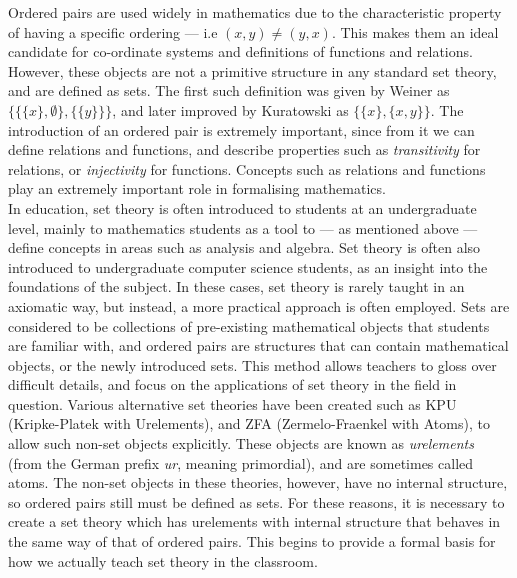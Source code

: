 \documentclass[11pt]{report}
\theoremstyle{definition}
\theoremstyle{theorem}
\theoremstyle{lemma}
\begin{document}
Ordered pairs are used widely in mathematics due to the characteristic property of having a specific ordering --- i.e $(x,y) \neq (y,x)$.
This makes them an ideal candidate for co-ordinate systems and definitions of functions and relations.
However, these objects are not a primitive structure in any standard set theory, and are defined as sets.
The first such definition was given by Weiner as $\{\{\{x\},\emptyset\},\{\{y\}\}\}$, and later improved by Kuratowski as $\{\{x\},\{x,y\}\}$.
The introduction of an ordered pair is extremely important, since from it we can define relations and functions, and describe properties such as \emph{transitivity} for relations, or \emph{injectivity} for functions.
Concepts such as relations and functions play an extremely important role in formalising mathematics.\\

In education, set theory is often introduced to students at an undergraduate level, mainly to mathematics students as a tool to --- as mentioned above --- define concepts in areas such as analysis and algebra.
Set theory is often also introduced to undergraduate computer science students, as an insight into the foundations of the subject.
In these cases, set theory is rarely taught in an axiomatic way, but instead, a more practical approach is often employed. 
Sets are considered to be collections of pre-existing mathematical objects that students are familiar with, and ordered pairs are structures that can contain mathematical objects, or the newly introduced sets.  
This method allows teachers to gloss over difficult details, and focus on the applications of set theory in the field in question.
Various alternative set theories have been created such as KPU (Kripke-Platek with Urelements), and ZFA (Zermelo-Fraenkel with Atoms), to allow such non-set objects explicitly.
These objects are known as \emph{urelements} (from the German prefix \emph{ur}, meaning primordial), and are sometimes called atoms.
The non-set objects in these theories, however, have no internal structure, so ordered pairs still must be defined as sets.
For these reasons, it is necessary to create a set theory which has urelements with internal structure that behaves in the same way of that of ordered pairs. 
This begins to provide a formal basis for how we actually teach set theory in the classroom. \\
\end{document}
